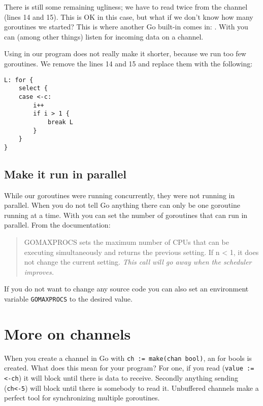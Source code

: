 \showremarks
There is still some remaining ugliness; we have to read twice from
the channel (lines 14 and 15). This is OK in this case, but what if
we don't know how many goroutines we started? This is where another
Go built-in comes in: . With  you 
can (among other things) listen for incoming data on a channel.

Using  in our program does not really make it shorter,
because we run too few goroutines. We remove the lines 14 and 15 and
replace them with the following:
\begin{lstlisting}[caption=Using select,numbers=right,firstnumber=14]
L: for {
	select {
	case <-c:
		i++ 
		if i > 1 { 
			break L
		}   
	}   
}   
\end{lstlisting}

\subsection{Make it run in parallel}
While our goroutines were running concurrently, they were not running in
parallel. When you do not tell Go anything there can only be one
goroutine running at a time. With  you
can set the number of goroutines that can run in parallel. From
the documentation:
\begin{quote}
GOMAXPROCS sets the maximum number of CPUs that can be executing
simultaneously and returns the previous setting. If n < 1, it does not
change the current setting. \emph{This call will go away when the scheduler
improves.}
\end{quote}
If you do not want to change any source code you can also set an
environment variable \verb|GOMAXPROCS| to the desired value.

\section{More on channels}
\label{sec:more on channels}
When you create a channel in Go with \lstinline{ch := make(chan bool)}, 
an  for
bools is created. What does this mean for your program? For one, if you
read (\lstinline{value := <-ch}) it will block until there is data to
receive. Secondly anything sending (\lstinline{ch<-5}) will block until there
is somebody to read it. 
Unbuffered channels make a perfect tool for synchronizing multiple
goroutines.

